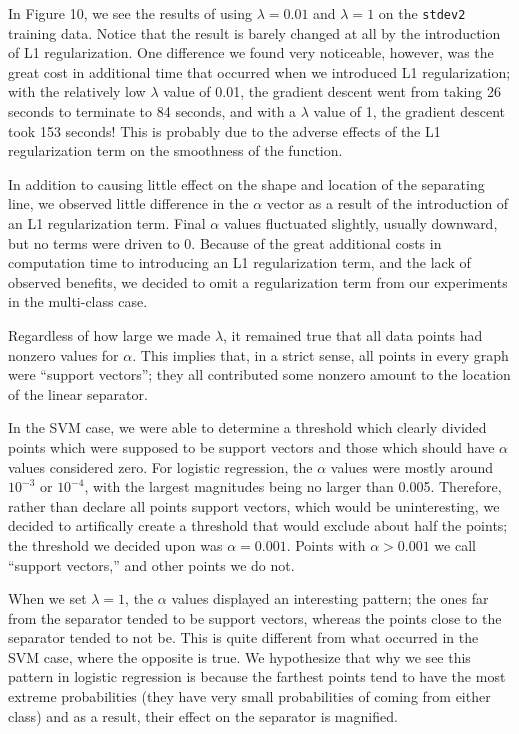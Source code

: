 \documentclass{sigchi}
\begin{document}
In Figure 10, we see the results of using $\lambda = 0.01$ and $\lambda = 1$ on the \texttt{stdev2} training data. Notice that the result is barely changed at all by the introduction of L1 regularization. One difference we found very noticeable, however, was the great cost in additional time that occurred when we introduced L1 regularization; with the relatively low $\lambda$ value of 0.01, the gradient descent went from taking 26 seconds to terminate to 84 seconds, and with a $\lambda$ value of 1, the gradient descent took 153 seconds! This is probably due to the adverse effects of the L1 regularization term on the smoothness of the function. 

In addition to causing little effect on the shape and location of the separating line, we observed little difference in the $\alpha$ vector as a result of the introduction of an L1 regularization term. Final $\alpha$ values fluctuated slightly, usually downward, but no terms were driven to 0. Because of the great additional costs in computation time to introducing an L1 regularization term, and the lack of observed benefits, we decided to omit a regularization term from our experiments in the multi-class case. 

Regardless of how large we made $\lambda$, it remained true that all data points had nonzero values for $\alpha$. This implies that, in a strict sense, all points in every graph were ``support vectors''; they all contributed some nonzero amount to the location of the linear separator.

In the SVM case, we were able to determine a threshold which clearly divided points which were supposed to be support vectors and those which should have $\alpha$ values considered zero. For logistic regression, the $\alpha$ values were mostly around $10^{-3}$ or $10^{-4}$, with the largest magnitudes being no larger than 0.005. Therefore, rather than declare all points support vectors, which would be uninteresting, we decided to artifically create a threshold that would exclude about half the points; the threshold we decided upon was $\alpha = 0.001$. Points with $\alpha > 0.001$ we call ``support vectors,'' and other points we do not.

When we set $\lambda = 1$, the $\alpha$ values displayed an interesting pattern; the ones far from the separator tended to be support vectors, whereas the points close to the separator tended to not be. This is quite different from what occurred in the SVM case, where the opposite is true. We hypothesize that why we see this pattern in logistic regression is because the farthest points tend to have the most extreme probabilities (they have very small probabilities of coming from either class) and as a result, their effect on the separator is magnified.
\end{document}
